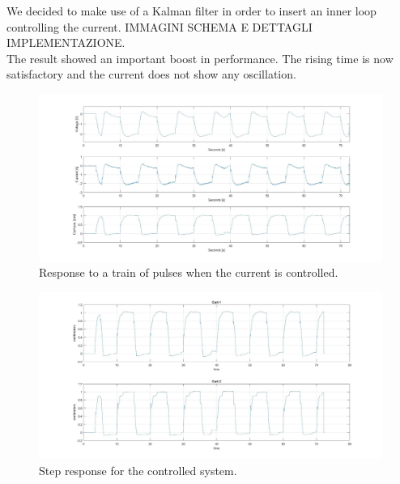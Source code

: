 We decided to make use of a Kalman filter in order to insert an inner loop controlling the current. IMMAGINI SCHEMA E DETTAGLI IMPLEMENTAZIONE. \\

The result showed an important boost in performance. The rising time is now satisfactory and the current does not show any oscillation.\\

\begin{figure}[h]
	\centering
	\includegraphics[width=0.9\linewidth]{img/hinf_curr}
	\caption{Response to a train of pulses when the current is controlled.}
	\label{fig:hinfnocurr}
\end{figure}

\begin{figure}[h]
	\centering
	\includegraphics[width=0.9\linewidth]{img/hinf_response}
	\caption{Step response for the controlled system.}
	\label{fig:hinfnocurr}
\end{figure}